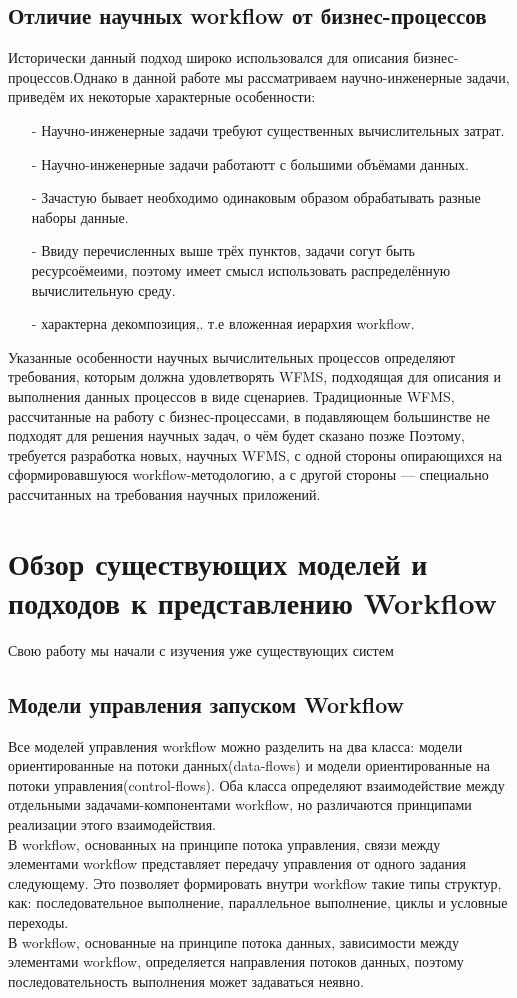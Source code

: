 \documentclass[a4paper,14pt]{article}
\begin{document}
\subsection*{Отличие научных workflow от бизнес-процессов}
  Исторически данный подход широко использовался для описания бизнес-процессов.Однако в данной работе мы рассматриваем научно-инженерные задачи, приведём их некоторые характерные особенности:
 
\begin{enumerate}
\item[-] Научно-инженерные задачи требуют существенных вычислительных затрат.
\item[-] Научно-инженерные задачи работаютт с большими объёмами данных.
\item[-] Зачастую бывает  необходимо одинаковым образом обрабатывать разные наборы данные.
\item[-]  Ввиду перечисленных выше трёх пунктов, задачи согут быть ресурсоёмеими, поэтому имеет смысл использовать распределённую вычислительную среду.
\item[-]  характерна декомпозиция,. т.е вложенная иерархия workflow.
\end{enumerate}

Указанные особенности научных вычислительных процессов определяют требования, которым должна удовлетворять WFMS, подходящая для
описания и выполнения данных процессов в виде сценариев. Традиционные WFMS, рассчитанные на работу с бизнес-процессами, в подавляющем большинстве не подходят для решения научных задач, о чём будет сказано позже Поэтому, требуется разработка новых, научных WFMS, с одной стороны опирающихся на сформировавшуюся workflow-методологию, а с другой стороны — специально рассчитанных на требования научных приложений.

\section{Обзор существующих моделей и подходов к представлению Workflow}

Свою работу мы начали с изучения уже существующих систем
\subsection*{Модели управления запуском Workflow}
  Все моделей управления workflow можно разделить на два класса: модели ориентированные на потоки данных(data-flows) и модели ориентированные на потоки управления(control-flows). Оба класса определяют взаимодействие между отдельными задачами-компонентами workflow, но различаются принципами реализации этого взаимодействия.  \\
  В workflow, основанных на принципе потока управления, связи между элементами workflow  представляет передачу управления от одного задания следующему. Это позволяет формировать внутри workflow такие типы структур, как: последовательное выполнение, параллельное выполнение, циклы и условные переходы.\\ 
  В workflow, основанные на принципе потока данных, зависимости между элементами workflow, определяется направления потоков данных, поэтому последовательность выполнения может задаваться неявно.
 
\end{document}
